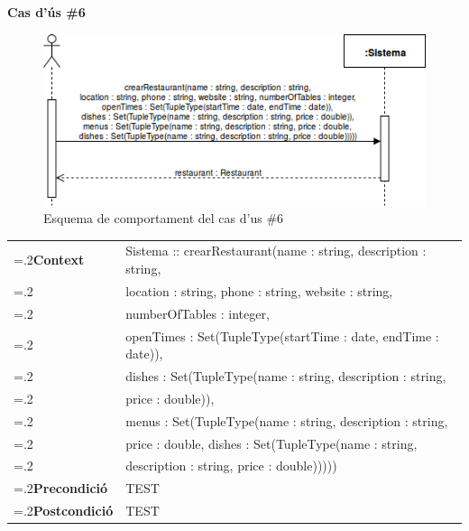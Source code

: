 \noindent\textbf{\large Cas d'ús \#6}\\
\begin{figure}[H]
\centering
\includegraphics[scale=0.6]{Figures/casdus_06.png}
\caption{Esquema de comportament del cas d'us \#6}
\end{figure}
\begin{table}[h]
\noindent
\begin{tabularx}{\linewidth}{
>{\hsize=.2\hsize}X%
>{\hsize=0.8\hsize}X%
}
\textbf{Context} 		& Sistema :: crearRestaurant(name : string, description : string, \\
						& location : string, phone : string, website : string, \\
						& numberOfTables : integer, \\
						& openTimes : Set(TupleType(startTime : date, endTime : date)),\\
						& dishes : Set(TupleType(name : string, description : string, \\
						& price : double)), \\
						& menus : Set(TupleType(name : string, description : string, \\
						& price : double, dishes : Set(TupleType(name : string, \\
						& description : string, price : double))))) \\
\textbf{Precondició} 	& TEST \\
\textbf{Postcondició}	& TEST \\
\end{tabularx}
\label{}
\end{table}

